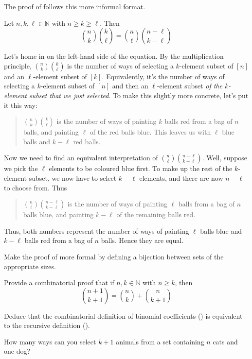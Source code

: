 The proof of  follows this more informal format.

\begin{proposition} \label{propBinomCoeffTwoColourBalls}
Let $n,k,\ell \in \mathbb{N}$ with $n \ge k \ge \ell$. Then
\[ \binom{n}{k}\binom{k}{\ell} = \binom{n}{\ell}\binom{n-\ell}{k-\ell} \]
\end{proposition}

\begin{cproof}
Let's home in on the left-hand side of the equation. By the multiplication principle, $\binom{n}{k} \binom{k}{\ell}$ is the number of ways of selecting a $k$-element subset of $[n]$ and an $\ell$-element subset of $[k]$. Equivalently, it's the number of ways of selecting a $k$-element subset of $[n]$ and then an $\ell$-element subset \textit{of the $k$-element subset that we just selected}. To make this slightly more concrete, let's put it this way:
\begin{quote}
$\binom{n}{k} \binom{k}{\ell}$ is the number of ways of painting $k$ balls red from a bag of $n$ balls, and painting $\ell$ of the red balls blue. This leaves us with $\ell$ blue balls and $k-\ell$ red balls.
\end{quote}
Now we need to find an equivalent interpretation of $\binom{n}{\ell} \binom{n-\ell}{k-\ell}$. Well, suppose we pick the $\ell$ elements to be coloured blue first. To make up the rest of the $k$-element subset, we now have to select $k-\ell$ elements, and there are now $n-\ell$ to choose from. Thus
\begin{quote}
$\binom{n}{\ell} \binom{n-\ell}{k-\ell}$ is the number of ways of painting $\ell$ balls from a bag of $n$ balls blue, and painting $k-\ell$ of the remaining balls red.
\end{quote}
Thus, both numbers represent the number of ways of painting $\ell$ balls blue and $k-\ell$ balls red from a bag of $n$ balls. Hence they are equal.
\end{cproof}

\begin{exercise}
Make the proof of  more formal by defining a bijection between sets of the appropriate sizes.
\end{exercise}

\begin{exercise}
\label{exPascalIdentity}
Provide a combinatorial proof that if $n,k \in \mathbb{N}$ with $n \ge k$, then
\[ \binom{n+1}{k+1} = \binom{n}{k} + \binom{n}{k+1} \]

Deduce that the combinatorial definition of binomial coefficients () is equivalent to the recursive definition ().
\begin{backhint}
How many ways can you select $k+1$ animals from a set containing $n$ cats and one dog?
\end{backhint}
\end{exercise}

